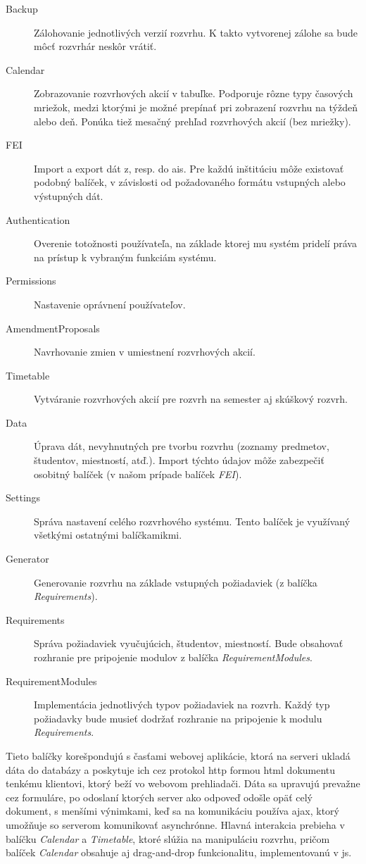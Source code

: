 \begin{description}
\item[Backup] Zálohovanie jednotlivých verzií rozvrhu. K takto vytvorenej zálohe
  sa bude môcť rozvrhár neskôr vrátiť.
\item[Calendar] Zobrazovanie rozvrhových akcií v tabuľke. Podporuje rôzne typy
  časových mriežok, medzi ktorými je možné prepínať pri zobrazení rozvrhu na
  týždeň alebo deň. Ponúka tiež mesačný prehľad rozvrhových akcií (bez mriežky).
\item[FEI] Import a export dát z, resp. do \acrshort{ais}. Pre každú inštitúciu
  môže existovať podobný balíček, v závislosti od požadovaného formátu vstupných
  alebo výstupných dát.
\item[Authentication] Overenie totožnosti používateľa, na základe ktorej mu
  systém pridelí práva na prístup k vybraným funkciám systému.
\item[Permissions] Nastavenie oprávnení používateľov.
\item[AmendmentProposals] Navrhovanie zmien v umiestnení rozvrhových akcií.
\item[Timetable] Vytváranie rozvrhových akcií pre rozvrh na semester aj skúškový
  rozvrh.
\item[Data] Úprava dát, nevyhnutných pre tvorbu rozvrhu (zoznamy predmetov,
  študentov, miestností, atď.). Import týchto údajov môže zabezpečiť osobitný
  balíček (v našom prípade balíček \emph{FEI}).
\item[Settings] Správa nastavení celého rozvrhového systému. Tento balíček je
  využívaný všetkými ostatnými balíčkamikmi.
\item[Generator] Generovanie rozvrhu na základe vstupných požiadaviek (z balíčka
  \emph{Requirements}).
\item[Requirements] Správa požiadaviek vyučujúcich, študentov, miestností. Bude
  obsahovať rozhranie pre pripojenie modulov z balíčka
  \emph{RequirementModules}.
\item[RequirementModules] Implementácia jednotlivých typov požiadaviek na
  rozvrh. Každý typ požiadavky bude musieť dodržať rozhranie na pripojenie k
  modulu \emph{Requirements}.
\end{description}

Tieto balíčky korešpondujú s časťami webovej aplikácie, ktorá na serveri ukladá
dáta do databázy a poskytuje ich cez protokol \acrshort{http} formou
\acrshort{html} dokumentu tenkému klientovi, ktorý beží vo webovom prehliadači.
Dáta sa upravujú prevažne cez formuláre, po odoslaní ktorých server ako odpoveď
odošle opäť celý dokument, s menšími výnimkami, keď sa na komunikáciu používa
\acrshort{ajax}, ktorý umožňuje so serverom komunikovať asynchrónne. Hlavná
interakcia prebieha v balíčku \emph{Calendar} a \emph{Timetable}, ktoré slúžia
na manipuláciu rozvrhu, pričom balíček \emph{Calendar} obsahuje aj drag-and-drop
funkcionalitu, implementovanú v \acrshort{js}.

